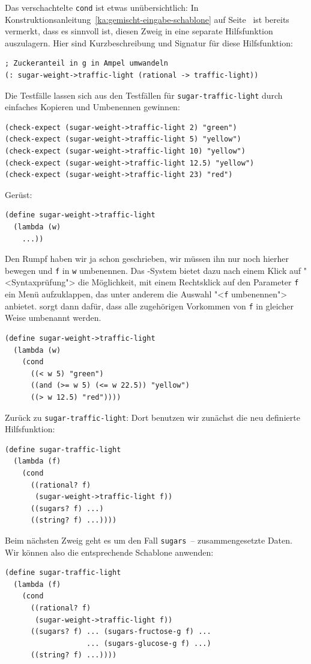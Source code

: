 %
Das verschachtelte \texttt{cond} ist etwas unübersichtlich: In
Konstruktionsanleitung~\ref{ka:gemischt-eingabe-schablone} auf
Seite~\pageref{page:separate-mixed-procs} ist bereits vermerkt, dass
es sinnvoll ist, diesen Zweig in eine separate Hilfsfunktion
auszulagern.  Hier sind Kurzbeschreibung und Signatur für diese
Hilfsfunktion:
%
\begin{verbatim}
; Zuckeranteil in g in Ampel umwandeln
(: sugar-weight->traffic-light (rational -> traffic-light))
\end{verbatim}
%
Die Testfälle lassen sich aus den Testfällen für
\texttt{sugar-traffic-light} durch einfaches Kopieren und Umbenennen
gewinnen:
%
\begin{verbatim}
(check-expect (sugar-weight->traffic-light 2) "green")
(check-expect (sugar-weight->traffic-light 5) "yellow")
(check-expect (sugar-weight->traffic-light 10) "yellow")
(check-expect (sugar-weight->traffic-light 12.5) "yellow")
(check-expect (sugar-weight->traffic-light 23) "red")
\end{verbatim}
%
Gerüst:
%
\begin{verbatim}
(define sugar-weight->traffic-light
  (lambda (w)
    ...))
\end{verbatim}
%
Den Rumpf haben wir ja schon geschrieben, wir müssen ihn nur noch
hierher bewegen und \texttt{f} in \texttt{w} umbenennen. Das \drscheme{}-System
bietet dazu nach einem Klick auf "<Syntaxprüfung"> die Möglichkeit, mit einem
Rechtsklick auf den Parameter \texttt{f} ein Menü aufzuklappen, das unter
anderem die Auswahl "<\texttt{f} umbenennen"> anbietet. \drscheme{} sorgt dann
dafür, dass alle zugehörigen Vorkommen von \texttt{f} in gleicher Weise
umbenannt werden.\label{def:sugar-weight-traffic-light}
%
\begin{verbatim}
(define sugar-weight->traffic-light
  (lambda (w)
    (cond
      ((< w 5) "green")
      ((and (>= w 5) (<= w 22.5)) "yellow")
      ((> w 12.5) "red"))))
\end{verbatim}
%
Zurück zu \texttt{sugar-traffic-light}: Dort benutzen wir zunächst die
neu definierte Hilfsfunktion:
%
\begin{verbatim}
(define sugar-traffic-light
  (lambda (f)
    (cond
      ((rational? f)
       (sugar-weight->traffic-light f))
      ((sugars? f) ...)
      ((string? f) ...))))
\end{verbatim}         
%
Beim nächsten Zweig geht es um den Fall \texttt{sugars}~--
zusammengesetzte Daten.  Wir können also die entsprechende Schablone
anwenden:
%
\begin{verbatim}
(define sugar-traffic-light
  (lambda (f)
    (cond
      ((rational? f)
       (sugar-weight->traffic-light f))
      ((sugars? f) ... (sugars-fructose-g f) ...
                   ... (sugars-glucose-g f) ...)
      ((string? f) ...))))
\end{verbatim}         
